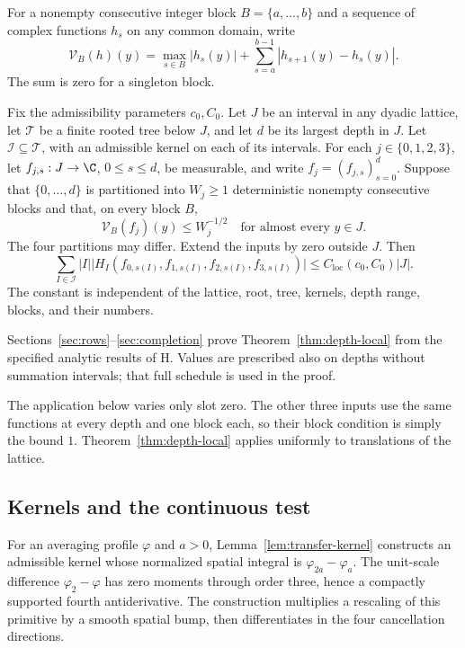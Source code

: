 For a nonempty consecutive integer block \(B=\{a,\ldots,b\}\) and a
sequence of complex functions \(h_s\) on any common domain, write
\[
 \mathcal V_B(h)(y)
   =\max_{s\in B}|h_s(y)|
       +\sum_{s=a}^{b-1}|h_{s+1}(y)-h_s(y)|.
\]
The sum is zero for a singleton block.

\begin{theorem}
\label{thm:depth-local}
Fix the admissibility parameters \(c_0,C_0\).  Let \(J\) be an interval
in any dyadic lattice, let \(\mathcal T\) be a finite rooted tree below
\(J\), and let \(d\) be its largest depth in \(J\).  Let
\(\mathcal I\subseteq\mathcal T\), with an admissible kernel on each of
its intervals.  For each \(j\in\{0,1,2,3\}\), let
\(f_{j,s}:J\to\C\), \(0\le s\le d\), be measurable, and write
\(f_j=(f_{j,s})_{s=0}^d\).  Suppose that
\(\{0,\ldots,d\}\) is partitioned into \(W_j\ge1\) deterministic nonempty
consecutive blocks and that, on every block \(B\),
\[
 \mathcal V_B(f_j)(y)\le W_j^{-1/2}
 \quad\text{for almost every }y\in J.
\]
The four partitions may differ.  Extend the inputs by zero outside \(J\).
Then
\begin{equation}
 \sum_{I\in\mathcal I}|I|
  \bigl|H_I(f_{0,s(I)},f_{1,s(I)},f_{2,s(I)},f_{3,s(I)})\bigr|
 \le C_{\mathrm{loc}}(c_0,C_0)|J|.
 \label{eq:depth-local}
\end{equation}
The constant is independent of the lattice, root, tree, kernels, depth
range, blocks, and their numbers.
\end{theorem}

Sections~\ref{sec:rows}--\ref{sec:completion} prove
Theorem~\ref{thm:depth-local} from the specified analytic results of H.
Values are prescribed also on depths
without summation intervals; that full schedule is used in the proof.

The application below varies only slot zero.  The other three inputs use
the same functions at every depth and one block each, so their block condition
is simply the bound \(1\).  Theorem~\ref{thm:depth-local} applies uniformly
to translations of the lattice.

\subsection{Kernels and the continuous test}

For an averaging profile \(\varphi\) and \(a>0\),
Lemma~\ref{lem:transfer-kernel} constructs an admissible kernel whose
normalized spatial integral is \(\varphi_{2a}-\varphi_a\).
The unit-scale difference \(\varphi_2-\varphi\) has zero moments through
order three, hence a compactly supported fourth antiderivative.  The
construction multiplies a rescaling of this primitive by a smooth spatial
bump, then differentiates in the four cancellation directions.

